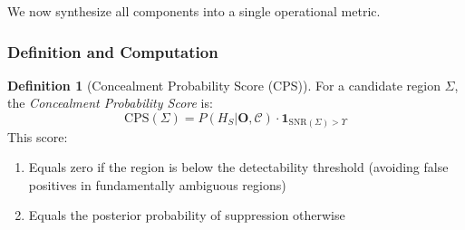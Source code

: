 \documentclass[12pt,a4paper]{article}
\theoremstyle{definition}
\newtheorem{definition}{Definition}[section]
\theoremstyle{remark}
\newcommand{\Yharim}{\Upsilon}           %
\begin{document}
We now synthesize all components into a single operational metric.

\subsubsection{Definition and Computation}

\begin{definition}[Concealment Probability Score (CPS)]
For a candidate region $\Sigma$, the \emph{Concealment Probability Score} is:
\begin{equation}
    \boxed{
    \text{CPS}(\Sigma) = P(H_S | \mathbf{O}, \mathcal{C}) \cdot \mathbf{1}_{\text{SNR}(\Sigma) > \Yharim}
    }
\end{equation}
This score:
\begin{enumerate}
    \item Equals zero if the region is below the detectability threshold (avoiding false positives in fundamentally ambiguous regions)
    \item Equals the posterior probability of suppression otherwise
\end{enumerate}
\end{definition}
\end{document}
